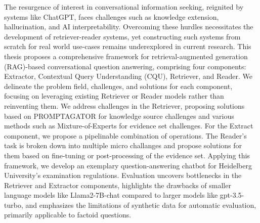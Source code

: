 The resurgence of interest in conversational information seeking, reignited by systems like ChatGPT, faces challenges such as knowledge extension, hallucination, and AI interpretability. Overcoming these hurdles necessitates the development of retriever-reader systems, yet constructing such systems from scratch for real world use-cases remains underexplored in current research. This thesis proposes a comprehensive framework for retrieval-augmented generation (RAG)-based conversational question answering, comprising four components: Extractor, Contextual Query Understanding (CQU), Retriever, and Reader. We delineate the problem field, challenges, and solutions for each component, focusing on leveraging existing Retriever or Reader models rather than reinventing them. We address challenges in the Retriever, proposing solutions based on PROMPTAGATOR for knowledge source challenges and various methods such as Mixture-of-Experts for evidence set challenges. For the Extract component, we propose a pipelinable combination of operations. The Reader's task is broken down into multiple micro challanges and propose solutions for them based on fine-tuning or post-processing of the evidence set. Applying this framework, we develop an exemplary question-answering chatbot for Heidelberg University's examination regulations. Evaluation uncovers bottlenecks in the Retriever and Extractor components, highlights the drawbacks of smaller language models like Llama2-7B-chat compared to larger models like gpt-3.5-turbo, and emphasizes the limitations of synthetic data for automatic evaluation, primarily applicable to factoid questions. 